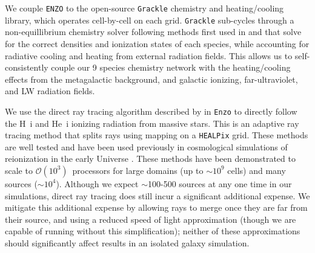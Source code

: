 \documentclass[11pt]{article}
\begin{document}
We couple \texttt{ENZO} to the open-source \texttt{Grackle} chemistry and heating/cooling library, which operates cell-by-cell on each grid. \texttt{Grackle} sub-cycles through a non-equillibrium chemistry solver following methods first used in \cite{Anninos1997} and \cite{Abel1997} that solve for the correct densities and ionization states of each species, while accounting for radiative cooling and heating from external radiation fields. This allows us to self-consistently couple our 9 species chemistry network with the heating/cooling effects from the metagalactic background, and galactic ionizing, far-ultraviolet, and LW radiation fields.


We use the direct ray tracing algorithm described by \cite{WiseAbel2011} in \texttt{Enzo} to directly follow the H~{\sc i} and He~{\sc i} ionizing radiation from massive stars. This is an adaptive ray tracing method that splits rays using mapping on a \texttt{HEALPix} grid. These methods are well tested and have been used previously in cosmological simulations of reionization in the early Universe \citep{Wise2012a, WiseAbel2012,Wise2014, Kim2013a, Kim2013b}. These methods have been demonstrated to scale to $\mathcal{O}(10^{3})$~processors for large domains (up to $\sim 10^9$ cells) and many sources ($\sim10^{4}$). Although we expect $\sim$100-500 sources at any one time in our simulations, direct ray tracing does still incur a significant additional expense. We mitigate this additional expense by allowing rays to merge once they are far from their source, and using a reduced speed of light approximation (though we are capable of running without this simplification); neither of these approximations should significantly affect results in an isolated galaxy simulation. 
\end{document}

